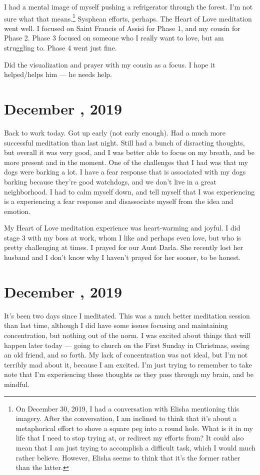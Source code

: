 \documentclass[b6paper]{article}
\begin{document}
I had a mental image of myself pushing a refrigerator through the forest. I'm not sure what that means.\footnote{On December 30, 2019, I had a conversation with Elisha mentioning this imagery. After the conversation, I am inclined to think that it's about a metaphorical effort to shove a square peg into a round hole. What is it in my life that I need to stop trying at, or redirect my efforts from? It could also mean that I am just trying to accomplish a difficult task, which I would much rather believe. However, Elisha seems to think that it's the former rather than the latter.} Sysphean efforts, perhaps. The Heart of Love meditation went well. I focused on Saint Francis of Assisi for Phase 1, and my cousin for Phase 2. Phase 3 focused on someone who I really want to love, but am struggling to. Phase 4 went just fine.

Did the visualization and prayer with my cousin as a focus. I hope it helped/helps him --- he needs help.

\pagebreak
\section*{December , 2019}

Back to work today. Got up early (not early enough). Had a much more successful meditation than last night. Still had a bunch of disracting thoughts, but overall it was very good, and I was better able to focus on my breath, and be more present and in the moment. One of the challenges that I had was that my dogs were barking a lot. I have a fear response that is associated with my dogs barking because they're good watchdogs, and we don't live in a great neighborhood. I had to calm myself down, and tell myself that I was experiencing is a experiencing a fear response and disassociate myself from the idea and emotion. 

My Heart of Love meditation experience was heart-warming and joyful. I did stage 3 with my boss at work, whom I like and perhaps even love, but who is pretty challenging at times. I prayed for our Aunt Darla. She recently lost her husband and I don't know why I haven't prayed for her sooner, to be honest.

\pagebreak
\section*{December , 2019}

It's been two days since I meditated. This was a much better meditation session than last time, although I did have some issues focusing and maintaining concentration, but nothing out of the norm. I was excited about things that will happen later today --- going to church on the First Sunday in Christmas, seeing an old friend, and so forth. My lack of concentration was not ideal, but I'm not terribly mad about it, because I am excited. I'm just trying to remember to take note that I'm experiencing these thoughts as they pass through my brain, and be mindful.
\end{document}
